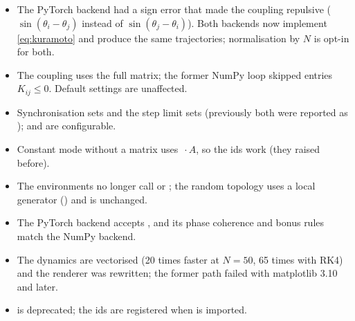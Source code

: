 \begin{itemize}
  \item The PyTorch backend had a sign error that made the coupling repulsive
        ($\sin(\theta_i - \theta_j)$ instead of $\sin(\theta_j - \theta_i)$).
        Both backends now implement \eqref{eq:kuramoto} and produce the same
        trajectories; normalisation by $N$ is opt-in for both.
  \item The coupling uses the full matrix; the former NumPy loop skipped entries
        $K_{ij} \le 0$. Default settings are unaffected.
  \item Synchronisation sets  and the step limit sets
         (previously both were reported as );
         and  are configurable.
  \item Constant mode without a matrix uses
        $\,\cdot A$, so the  ids
        work (they raised before).
  \item The environments no longer call  or
        ; the random topology uses a local
        generator () and is unchanged.
  \item The PyTorch backend accepts , and its phase
        coherence and bonus rules match the NumPy backend.
  \item The dynamics are vectorised (20 times faster at $N = 50$, 65 times with
        RK4) and the renderer was rewritten; the former  path
        failed with matplotlib 3.10 and later.
  \item {} is deprecated; the ids are
        registered when  is imported.
\end{itemize}

\endgroup
